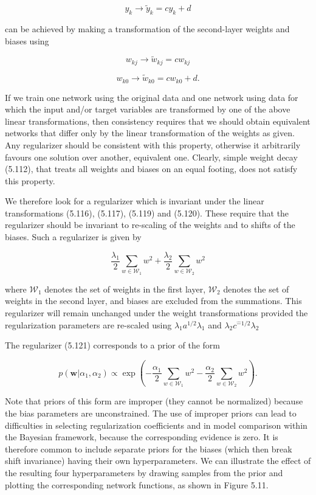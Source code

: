 \documentclass[
  10
]{article}
\begin{document}
\[
y _ {k} \rightarrow \widetilde {y} _ {k} = c y _ {k} + d\tag{5.118}
\]

can be achieved by making a transformation of the second-layer weights
and biases using

\[
w _ {k j} \rightarrow \widetilde {w} _ {k j} = c w _ {k j}\tag{5.119}
\]

\[
w _ {k 0} \rightarrow \widetilde {w} _ {k 0} = c w _ {k 0} + d.\tag{5.120}
\]

If we train one network using the original data and one network using
data for which the input and/or target variables are transformed by one
of the above linear transformations, then consistency requires that we
should obtain equivalent networks that differ only by the linear
transformation of the weights as given. Any regularizer should be
consistent with this property, otherwise it arbitrarily favours one
solution over another, equivalent one. Clearly, simple weight decay
(5.112), that treats all weights and biases on an equal footing, does
not satisfy this property.

We therefore look for a regularizer which is invariant under the linear
transformations (5.116), (5.117), (5.119) and (5.120). These require
that the regularizer should be invariant to re-scaling of the weights
and to shifts of the biases. Such a regularizer is given by

\[
\frac {\lambda_ {1}}{2} \sum_ {w \in \mathcal {W} _ {1}} w ^ {2} + \frac {\lambda_ {2}}{2} \sum_ {w \in \mathcal {W} _ {2}} w ^ {2}\tag{5.121}
\]

where \(\mathcal { W } _ { 1 }\) denotes the set of weights in the first
layer, \(\mathcal { W } _ { 2 }\) denotes the set of weights in the
second layer, and biases are excluded from the summations. This
regularizer will remain unchanged under the weight transformations
provided the regularization parameters are re-scaled using
\(\lambda _ { 1 } \stackrel {  } {  } \stackrel {  } { a } ^ { 1 / 2 } \lambda _ { 1 }\)
and \(\lambda _ { 2 }  c ^ { \hat { - } 1 / 2 } \lambda _ { 2 }\)

The regularizer (5.121) corresponds to a prior of the form

\[
p (\mathbf {w} | \alpha_ {1}, \alpha_ {2}) \propto \exp \left(- \frac {\alpha_ {1}}{2} \sum_ {w \in \mathcal {W} _ {1}} w ^ {2} - \frac {\alpha_ {2}}{2} \sum_ {w \in \mathcal {W} _ {2}} w ^ {2}\right).\tag{5.122}
\]

Note that priors of this form are improper (they cannot be normalized)
because the bias parameters are unconstrained. The use of improper
priors can lead to difficulties in selecting regularization coefficients
and in model comparison within the Bayesian framework, because the
corresponding evidence is zero. It is therefore common to include
separate priors for the biases (which then break shift invariance)
having their own hyperparameters. We can illustrate the effect of the
resulting four hyperparameters by drawing samples from the prior and
plotting the corresponding network functions, as shown in Figure 5.11.
\end{document}
